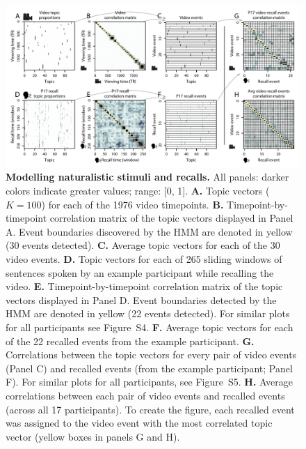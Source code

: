 \documentclass{article}
\newcommand{\corrmats}{S4}
\newcommand{\matchmats}{S5}
\begin{document}
\begin{figure}[tp]
\centering
\includegraphics[width=\textwidth]{figs/eventseg}
\caption{\small \textbf{Modelling naturalistic stimuli and recalls.} All panels: darker colors indicate greater values; range: [0, 1].  \textbf{A.} Topic vectors ($K = 100$) for each of the 1976 video timepoints.  \textbf{B.} Timepoint-by-timepoint correlation matrix of the topic vectors displayed in Panel A.  Event boundaries discovered by the HMM are denoted in yellow (30 events detected).  \textbf{C.} Average topic vectors for each of the 30 video events. \textbf{D.} Topic vectors for each of 265 sliding windows of sentences spoken by an example participant while recalling the video.  \textbf{E.} Timepoint-by-timepoint correlation matrix of the topic vectors displayed in Panel D. Event boundaries detected by the HMM are denoted in yellow (22 events detected).  For similar plots for all participants see Figure~\corrmats.  \textbf{F.} Average topic vectors for each of the 22 recalled events from the example participant.  \textbf{G.} Correlations between the topic vectors for every pair of video events (Panel C) and recalled events (from the example participant; Panel F).  For similar plots for all participants, see Figure~\matchmats.  \textbf{H.} Average correlations between each pair of video events and recalled events (across all 17 participants).  To create the figure, each recalled event was assigned to the video event with the most correlated topic vector (yellow boxes in panels G and H).}
\label{fig:model}
\end{figure}
\end{document}
